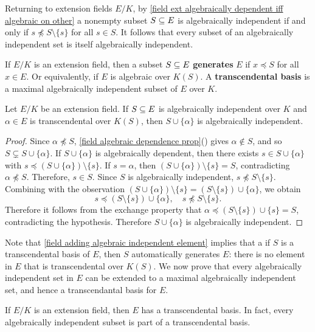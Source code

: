 Returning to extension fields $E/K$, by \cref{field ext algebraically dependent iff algebraic on other} a nonempty subset $S\subseteq E$ is algebraically independent if and only if $s\not\preceq S\setminus\{s\}$ for all $s\in S$. It follows that every subset of an algebraically independent set is itself algebraically independent.
\begin{definition}
If $E/K$ is an extension field, then a subset $S\subseteq E$ \textbf{generates} $E$ if $x\preceq S$ for all $x\in E$. Or equivalently, if $E$ is algebraic over $K(S)$. A \textbf{transcendental basis} is a maximal algebraically independent subset of $E$ over $K$.
\end{definition}
\begin{lemma}\label{field adding algebraic independent element}
Let $E/K$ be an extension field. If $S\subseteq E$ is algebraically independent over $K$ and $\alpha\in E$ is transcendental over $K(S)$, then $S\cup\{\alpha\}$ is algebraically independent.
\end{lemma}
\begin{proof}
Since $\alpha\not\preceq S$, \cref{field algebraic dependence prop}() gives $\alpha\notin S$, and so $S\subsetneq S\cup\{\alpha\}$. If $S\cup\{\alpha\}$ is algebraically dependent, then there exists $s\in S\cup\{\alpha\}$ with $s\preceq(S\cup\{\alpha\})\setminus\{s\}$. If $s=\alpha$, then $(S\cup\{\alpha\})\setminus\{s\}=S$, contradicting $\alpha\not\preceq S$. Therefore, $s\in S$. Since $S$ is algebraically independent, $s\not\preceq S\setminus\{s\}$. Combining with the observation $(S\cup\{\alpha\})\setminus\{s\}=(S\setminus\{s\})\cup\{\alpha\}$, we obtain
\[s\preceq(S\setminus\{s\})\cup\{\alpha\},\quad s\not\preceq S\setminus\{s\}.\]
Therefore it follows from the exchange property that $\alpha\preceq(S\setminus\{s\})\cup\{s\}=S$, contradicting the hypothesis. Therefore $S\cup\{\alpha\}$ is algebraically independent.
\end{proof}
Note that \cref{field adding algebraic independent element} implies that a if $S$ is a transcendental basis of $E$, then $S$ automatically generates $E$: there is no element in $E$ that is transcendental over $K(S)$. We now prove that every algebraically independent set in $E$ can be extended to a maximal algebraically independent set, and hence a transcendantal basis for $E$.
\begin{theorem}\label{field transcendental basis exist} 
If $E/K$ is an extension field, then $E$ has a transcendental basis. In fact, every algebraically independent subset is part of a transcendental basis.
\end{theorem}
